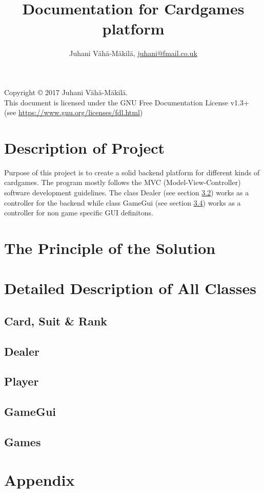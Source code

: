 \documentclass[11pt,a4paper]{article}
\begin{document}
\title{Documentation for Cardgames platform}
\author{Juhani Vähä-Mäkilä, \url{juhani@fmail.co.uk}}
\maketitle
\noindent{}Copyright \copyright{} 2017 Juhani Vähä-Mäkilä.
\\This document is licensed under the GNU Free Documentation License v1.3+ (see \url{https://www.gnu.org/licenses/fdl.html})
\newpage
{}
\tableofcontents
\newpage
\section{Description of Project}
Purpose of this project is to create a solid backend platform for different kinds of cardgames. The program mostly follows the MVC (Model-View-Controller) software development guidelines. The class Dealer (see section \ref{dealer})  works as a controller for the backend while class GameGui (see section \ref{gamegui}) works as a controller for non game specific GUI definitons.
\section{The Principle of the Solution}

\section[Description of Program]{Detailed Description of All Classes}
\subsection[Card]{Card, Suit \& Rank}
\subsection{Dealer}\label{dealer}
\subsection{Player}
\subsection{GameGui}\label{gamegui}
\subsection{Games}
\section{Appendix}


\end{document}
